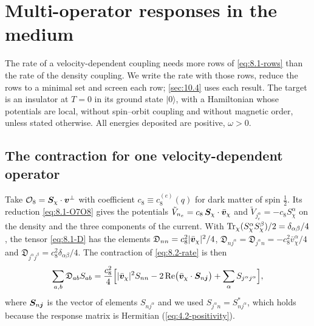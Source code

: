 \section{Multi-operator responses in the medium}\label{app:D.30}

The rate of a velocity-dependent coupling needs more rows of \cref{eq:8.1-rows} than the rate of the density coupling. We write the rate with those rows, reduce the rows to a minimal set and screen each row; \cref{sec:10.4} uses each result. The target is an insulator at $T = 0$ in its ground state $|0\rangle$, with a Hamiltonian whose potentials are local, without spin--orbit coupling and without magnetic order, unless stated otherwise. All energies deposited are positive, $\omega > 0$.

\subsection{The contraction for one velocity-dependent operator}

Take $\mathcal{O}_8 = \bm{S}_\chi\cdot\bm{v}^\perp$ with coefficient $c_8 \equiv c_8^{(e)}(q)$ for dark matter of spin $\frac12$. Its reduction \cref{eq:8.1-O7O8} gives the potentials $\tilde V_{n_e} = c_8\,\bm{S}_\chi\cdot\bar{\bm{v}}_\chi$ and $\tilde V_{j^\alpha_e} = -c_8S^\alpha_\chi$ on the density and the three components of the current. With $\operatorname{Tr}_\chi(S^\alpha_\chi S^\beta_\chi)/2 = \delta_{\alpha\beta}/4$, the tensor \cref{eq:8.1-D} has the elements $\mathfrak{D}_{nn} = c_8^2|\bar{\bm{v}}_\chi|^2/4$, $\mathfrak{D}_{nj^\alpha} = \mathfrak{D}_{j^\alpha n} = -c_8^2\bar v^\alpha_\chi/4$ and $\mathfrak{D}_{j^\alpha j^\beta} = c_8^2\delta_{\alpha\beta}/4$. The contraction of \cref{eq:8.2-rate} is then
\begin{equation}
  \sum_{a,b}\mathfrak{D}_{ab}S_{ab} = \frac{c_8^2}{4}\Bigl[|\bar{\bm{v}}_\chi|^2S_{nn} - 2\operatorname{Re}\bigl(\bar{\bm{v}}_\chi\cdot\bm{S}_{n\bm{j}}\bigr) + \sum_\alpha S_{j^\alpha j^\alpha}\Bigr] ,
  \label{eq:D.30-O8}
\end{equation}
where $\bm{S}_{n\bm{j}}$ is the vector of elements $S_{nj^\alpha}$ and we used $S_{j^\alpha n} = S_{nj^\alpha}^*$, which holds because the response matrix is Hermitian (\cref{eq:4.2-positivity}).

